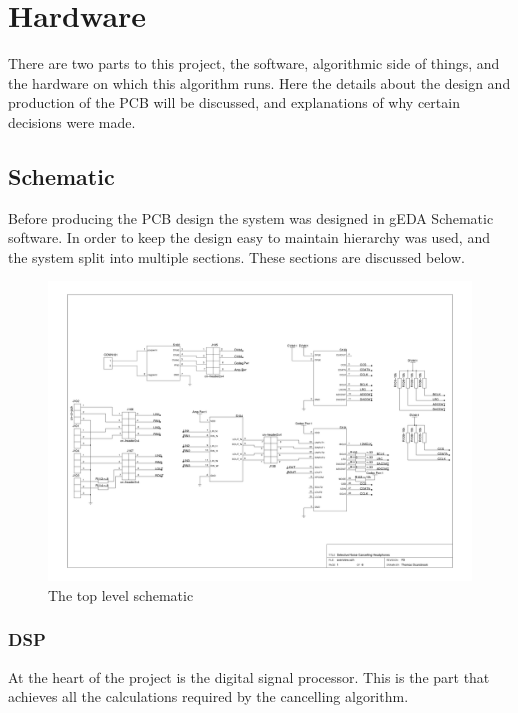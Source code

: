 \section{Hardware}

There are two parts to this project, the software, algorithmic side of things, and the hardware on which this algorithm runs.
Here the details about the design and production of the PCB will be discussed, and explanations of why certain decisions were made.

\subsection{Schematic}
Before producing the PCB design the system was designed in gEDA Schematic software.
In order to keep the design easy to maintain hierarchy was used, and the system split into multiple sections.
These sections are discussed below.

\begin{figure}[H]
	\centering
	\includegraphics[width=\textwidth]{./img/overview.png}
	\caption{The top level schematic}
	\label{fig:overviewsch}
\end{figure}

\subsubsection{DSP}
At the heart of the project is the digital signal processor.
This is the part that achieves all the calculations required by the cancelling algorithm.

